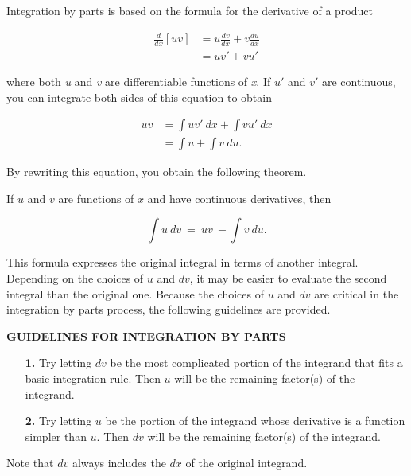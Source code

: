 \documentclass[12pt]{article}
\begin{document}
\noindent Integration by parts is based on the formula for the derivative of a product 

\begin{align*}
\frac{d}{dx} [uv] &= u \frac{dv}{dx} + v \frac{du}{dx}\\
 &= uv' + vu'
\end{align*}

\noindent where both \textit{u} and \textit{v} are differentiable functions of \textit{x}. If $u'$ and $v'$ are continuous, you can integrate both sides of this equation to obtain

\begin{align*}
uv &= \int uv' \ dx + \int vu' \ dx\\
&= \int u + \int v \ du.
\end{align*}

\noindent By rewriting this equation, you obtain the following theorem.

\begin{tcolorbox}[colback = white!5!white, 
				  colframe = myblue,
				  colbacktitle = white!5!white,
				  drop shadow southeast, 
				  enhanced,
				  sharp corners = all, 
title =\color{myblue}\textbf{THEOREM 8.1 \color{black} INTEGRATION BY PARTS}]
If $u$ and $v$ are functions of $x$ and have continuous derivatives, then

$$ \int u \ dv \ = \ uv \ - \int v \ du.$$
\end{tcolorbox}

\bigskip

This formula expresses the original integral in terms of another integral. Depending on the choices of $u$ and $dv$, it may be easier to evaluate the second integral than the original one. Because the choices of $u$ and $dv$ are critical in the integration by parts process, the following guidelines are provided. 

\sffamily
\begin{tcolorbox}[colback = beige!75!white,
				  sharp corners = all,
				  colframe = beige!75!white]
\textbf{GUIDELINES FOR INTEGRATION BY PARTS}
\rmfamily
\begin{enumerate}
\item[\textbf{1.}] Try letting $dv$ be the most complicated portion of the integrand that fits a basic integration rule. Then $u$ will be the remaining factor(s) of the integrand.

\item[\textbf{2.}] Try letting $u$ be the portion of the integrand whose derivative is a function simpler than $u$. Then $dv$ will be the remaining factor(s) of the integrand.
\end{enumerate}

\noindent Note that $dv$ always includes the $dx$ of the original integrand. 
\end{tcolorbox}
\end{document}
